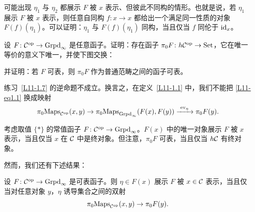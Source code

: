 \begin{warning}\label{L11-1.6}
可能出现 $\eta_1$ 与 $\eta_2$ 都展示 $F$ 被 $x$ 表示、但彼此不同构的情形。也就是说，若 $\eta_1$ 展示 $F$ 被 $x$ 表示，则任意自同构 $f\colon x\to x$ 都给出一个满足同一性质的对象 $F(f)(\eta_1)$。可以证明：$\eta_1$ 与 $F(f)(\eta_1)$ 同构，当且仅当 $f$ 同伦于 $\operatorname{id}_x$。
\end{warning}

\begin{exercise}\label{L11-1.7}
设 $F\colon\mathcal{C}^{\mathrm{op}}\to\operatorname{Grpd}_\infty$ 是任意函子。证明：存在函子 $\pi_0F\colon h\mathcal{C}^{\mathrm{op}}\to\operatorname{Set}$，它在唯一等价的意义下唯一，并使下图交换：
\begin{center}
\end{center}
并证明：若 $F$ 可表，则 $\pi_0F$ 作为普通范畴之间的函子可表。
\end{exercise}

\begin{warning}\label{L11-1.8}
练习~\ref{L11-1.7} 的逆命题不成立。换言之，在定义~\ref{L11-1.1} 中，我们不能把 \eqref{L11-eq1.1} 换成映射
\[
\pi_0\mathrm{Maps}_{\cC^{\op}}(x,y)\to\pi_0\mathrm{Maps}_{\Grpd_\infty}(F(x),F(y))\xrightarrow{\ \mathrm{ev}_\eta\ }\pi_0F(y).
\]
\end{warning}

\begin{exercise}\label{L11-1.9}
考虑取值 $\{\ast\}$ 的常值函子 $F\colon\mathcal{C}^{\mathrm{op}}\to\operatorname{Grpd}_\infty$。$F(x)$ 中的唯一对象展示 $F$ 被 $x$ 表示，当且仅当 $x$ 在 $\mathcal{C}$ 中是终对象。但注意，$\pi_0F$ 可表，当且仅当 $h\mathcal{C}$ 有终对象。
\end{exercise}

\nitem\label{L11-1.10} 然而，我们还有下述结果：

\begin{proposition}\label{L11-1.11}
设 $F\colon\mathcal{C}^{\mathrm{op}}\to\operatorname{Grpd}_\infty$ 是可表函子。则 $\eta\in F(x)$ 展示 $F$ 被 $x\in\mathcal{C}$ 表示，当且仅当对任意对象 $y$，$\eta$ 诱导集合之间的双射
\[
\pi_0\mathrm{Maps}_{\mathcal{C}^{\mathrm{op}}}(x,y)\to\pi_0F(y).
\]
\end{proposition}

